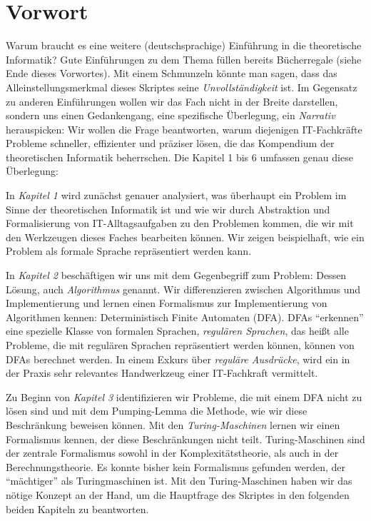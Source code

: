 \chapter{Vorwort}

Warum braucht es eine weitere (deutschsprachige) Einführung
in die theoretische Informatik?
Gute Einführungen zu dem Thema füllen bereits Bücherregale
(siehe Ende dieses Vorwortes).
Mit einem Schmunzeln könnte man sagen,
dass das Alleinstellungsmerkmal dieses Skriptes seine
\emph{Unvollständigkeit} ist.
Im Gegensatz zu anderen Einführungen wollen wir das Fach nicht in der Breite darstellen,
sondern uns einen Gedankengang, eine spezifische Überlegung,
ein \emph{Narrativ} herauspicken:
Wir wollen die Frage beantworten,
warum diejenigen IT-Fachkräfte Probleme
schneller, effizienter und präziser lösen,
die das Kompendium der theoretischen Informatik beherrschen.
Die Kapitel 1 bis 6 umfassen genau diese Überlegung:

In \emph{Kapitel 1} wird zunächst genauer analysiert,
was überhaupt ein Problem im Sinne der theoretischen Informatik ist
und wie wir durch Abstraktion und Formalisierung von IT-Alltagsaufgaben
zu den Problemen kommen, die wir mit den Werkzeugen dieses Faches bearbeiten können.
Wir zeigen beispielhaft,
wie ein Problem als formale Sprache repräsentiert werden kann.

In \emph{Kapitel 2} beschäftigen wir uns mit dem Gegenbegriff zum Problem:
Dessen Lösung, auch \emph{Algorithmus} genannt.
Wir differenzieren zwischen Algorithmus und Implementierung
und lernen einen Formalismus zur Implementierung von Algorithmen kennen:
Deterministisch Finite Automaten (DFA).
DFAs ``erkennen'' eine spezielle Klasse von formalen Sprachen,
\emph{regulären Sprachen},
das heißt alle Probleme, die mit regulären Sprachen repräsentiert werden können,
können von DFAs berechnet werden.
In einem Exkurs über \emph{reguläre Ausdrücke},
wird ein in der Praxis sehr relevantes Handwerkzeug einer IT-Fachkraft vermittelt.

Zu Beginn von \emph{Kapitel 3} identifizieren wir Probleme,
die mit einem DFA nicht zu lösen sind
und mit dem Pumping-Lemma die Methode, wie wir diese Beschränkung beweisen können.
Mit den \emph{Turing-Maschinen} lernen wir einen Formalismus kennen,
der diese Beschränkungen nicht teilt.
Turing-Maschinen sind der zentrale Formalismus sowohl
in der Komplexitätstheorie,
als auch in der Berechnungstheorie.
Es konnte bisher kein Formalismus gefunden werden,
der ``mächtiger'' als Turingmaschinen ist.
Mit den Turing-Maschinen haben wir das nötige Konzept an der Hand,
um die Hauptfrage des Skriptes in den folgenden beiden Kapiteln zu beantworten.

